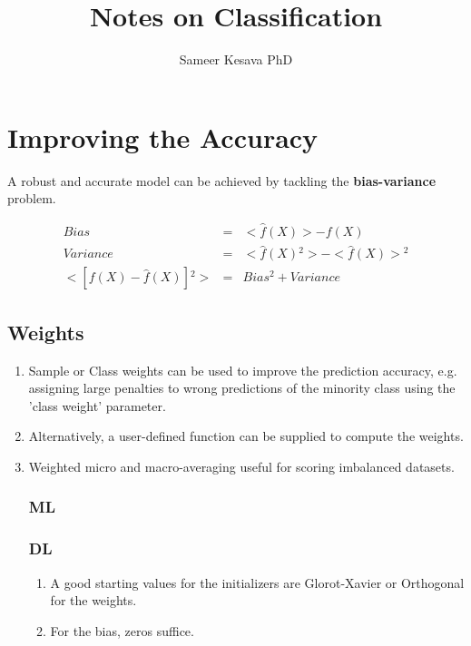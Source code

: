 \documentclass[a4paper, 12pt]{report}
\begin{document}
\title{Notes on Classification}
\author{Sameer Kesava PhD}
\date{} %
\maketitle

\tableofcontents
\newpage



\chapter{Improving the Accuracy}
A robust and accurate model can be achieved by tackling the \textbf{bias-variance} problem.

\begin{eqnarray}
Bias & = & <\hat{f}(X)> - f(X)\\
Variance & = & <\hat{f}(X){^{2}}> - <\hat{f}(X)>{^{2}}\\
<[f(X) - \hat{f}(X)]{^{2}}> & = & Bias{^{2}} + Variance
\end{eqnarray}

\section{Weights}
\label{sec:weights}
\begin{enumerate}
\item Sample or Class weights can be used to improve the prediction accuracy, e.g. assigning large penalties to wrong predictions of the minority class using the 'class weight' parameter.
\item Alternatively, a user-defined function can be supplied to compute the weights.
\item Weighted micro and macro-averaging useful for scoring imbalanced datasets.

\subsection{ML}

\subsection{DL}
\begin{enumerate}
\item A good starting values for the initializers are Glorot-Xavier or Orthogonal for the weights.
\item For the bias, zeros suffice.
\end{enumerate}
\end{enumerate}
\end{document}
